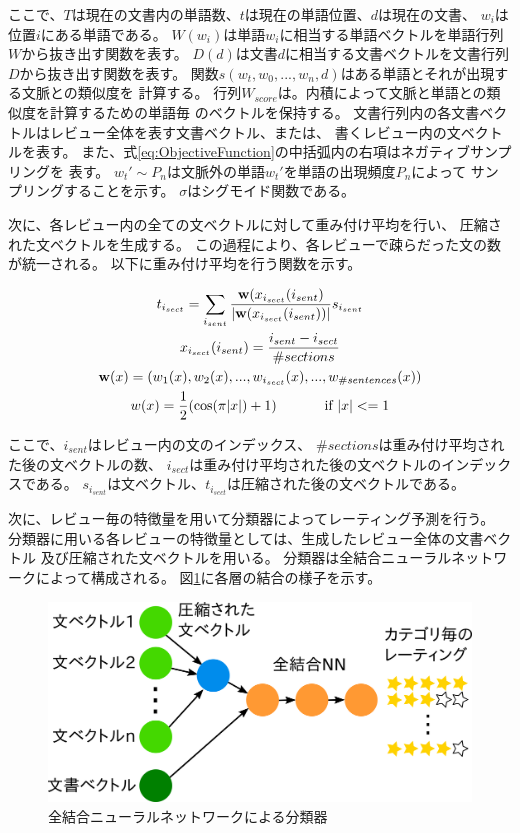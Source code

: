 \documentclass{ttithesis}
\begin{document}
ここで、$T$は現在の文書内の単語数、$t$は現在の単語位置、$d$は現在の文書、
$w_i$は位置$i$にある単語である。
$W(w_i)$は単語$w_i$に相当する単語ベクトルを単語行列$W$から抜き出す関数を表す。
$D(d)$は文書$d$に相当する文書ベクトルを文書行列$D$から抜き出す関数を表す。
関数$s(w_t, w_0, ..., w_n, d)$はある単語とそれが出現する文脈との類似度を
計算する。
行列$W_{score}$は。内積によって文脈と単語との類似度を計算するための単語毎
のベクトルを保持する。
文書行列内の各文書ベクトルはレビュー全体を表す文書ベクトル、または、
書くレビュー内の文ベクトルを表す。
また、式\ref{eq:ObjectiveFunction}の中括弧内の右項はネガティブサンプリングを
表す。
$w_{t}' \sim P_n$は文脈外の単語$w_{t}'$を単語の出現頻度$P_n$によって
サンプリングすることを示す。
$\sigma$はシグモイド関数である。

次に、各レビュー内の全ての文ベクトルに対して重み付け平均を行い、
圧縮された文ベクトルを生成する。
この過程により、各レビューで疎らだった文の数が統一される。
以下に重み付け平均を行う関数を示す。

\begin{gather}
  t_{i_{sect}} = \sum_{i_{sent}} \frac{\mathbf{w}(x_{i_{sect}}(i_{sent})}
                                      {|\mathbf{w}(x_{i_{sect}}(i_{sent}))|}
                                 s_{i_{sent}} \\
  x_{i_{sect}}(i_{sent}) = \frac{i_{sent} - i_{sect}}{\#sections} \\
  \mathbf{w}(x) = (w_{1}(x), w_{2}(x), ..., w_{i_{sect}}(x),
                   ..., w_{\#sentences}(x)) \\
  w(x) = \frac{1}{2} (\cos(\pi|x|) + 1) \hspace{8ex} \text{if $|x| <= 1$}
\end{gather}

ここで、$i_{sent}$はレビュー内の文のインデックス、
$\#sections$は重み付け平均された後の文ベクトルの数、
$i_{sect}$は重み付け平均された後の文ベクトルのインデックスである。
$s_{i_{sent}}$は文ベクトル、$t_{i_{sect}}$は圧縮された後の文ベクトルである。

次に、レビュー毎の特徴量を用いて分類器によってレーティング予測を行う。
分類器に用いる各レビューの特徴量としては、生成したレビュー全体の文書ベクトル
及び圧縮された文ベクトルを用いる。
分類器は全結合ニューラルネットワークによって構成される。
図\ref{fig:MyModel}に各層の結合の様子を示す。

\begin{figure}
  \includegraphics{fig/model.png}
  \caption{全結合ニューラルネットワークによる分類器}
  \label{fig:MyModel}
\end{figure}
\end{document}
